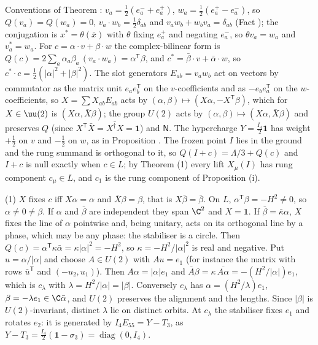 Conventions of Theorem : $v_{a} = \tfrac12(e_{a}^{-} + e_{a}^{+})$, $w_{a} = \tfrac12(e_{a}^{+} - e_{a}^{-})$, so $Q(v_{a}) = Q(w_{a}) = 0$, $v_{a}\cdot w_{b} = \tfrac12\delta_{ab}$ and $v_{a}w_{b} + w_{b}v_{a} = \delta_{ab}$ (Fact ); the conjugation is $x^{*} = \theta(\bar{x})$ with $\theta$ fixing $e_{a}^{+}$ and negating $e_{a}^{-}$, so $\theta v_{a} = w_{a}$ and $v_{a}^{*} = w_{a}$. For $c = \alpha\cdot v + \beta\cdot w$ the complex-bilinear form is $Q(c) = 2\sum_{a}\alpha_{a}\beta_{a}\,(v_{a}\cdot w_{a}) = \alpha^{\mathsf T}\beta$, and $c^{*} = \bar{\beta}\cdot v + \bar{\alpha}\cdot w$, so $c^{*}\cdot c = \tfrac12(|\alpha|^{2} + |\beta|^{2})$. The slot generators $E_{ab} = v_{a}w_{b}$ act on vectors by commutator as the matrix unit $e_{a}e_{b}^{\mathsf T}$ on the $v$-coefficients and as $-e_{b}e_{a}^{\mathsf T}$ on the $w$-coefficients, so $X = \sum X_{ab}E_{ab}$ acts by $(\alpha, \beta) \mapsto (X\alpha, -X^{\mathsf T}\beta)$, which for $X \in \uu(2)$ is $(X\alpha, \bar{X}\beta)$; the group $U(2)$ acts by $(\alpha, \beta) \mapsto (X\alpha, \bar{X}\beta)$ and preserves $Q$ (since $X^{\mathsf T}\bar{X} = \overline{X^{\dagger}X} = \mathbf{1}$) and $\mathsf{N}$. The hypercharge $Y = \tfrac{I_{4}}{2}\mathbf{1}$ has weight $+\tfrac12$ on $v$ and $-\tfrac12$ on $w$, as in Proposition . The frozen point $I$ lies in the ground and the rung summand is orthogonal to it, so $Q(I + c) = \Lambda/3 + Q(c)$ and $I + c$ is null exactly when $c \in L$; by Theorem (1) every lift $X_{\mu}(I)$ has rung component $c_{\mu} \in L$, and $c_{1}$ is the rung component of Proposition (i).

(1) $X$ fixes $c$ iff $X\alpha = \alpha$ and $\bar{X}\beta = \beta$, that is $X\bar{\beta} = \bar{\beta}$. On $L$, $\alpha^{\mathsf T}\beta = -H^{2} \ne 0$, so $\alpha \ne 0 \ne \beta$. If $\alpha$ and $\bar{\beta}$ are independent they span $\C^{2}$ and $X = \mathbf{1}$. If $\bar{\beta} = \bar{\kappa}\alpha$, $X$ fixes the line of $\alpha$ pointwise and, being unitary, acts on its orthogonal line by a phase, which may be any phase: the stabiliser is a circle. Then $Q(c) = \alpha^{\mathsf T}\kappa\bar{\alpha} = \kappa|\alpha|^{2} = -H^{2}$, so $\kappa = -H^{2}/|\alpha|^{2}$ is real and negative. Put $u = \alpha/|\alpha|$ and choose $A \in U(2)$ with $Au = e_{1}$ (for instance the matrix with rows $\bar{u}^{\mathsf T}$ and $(-u_{2}, u_{1})$). Then $A\alpha = |\alpha|e_{1}$ and $\bar{A}\beta = \kappa\,\overline{A\alpha} = -(H^{2}/|\alpha|)e_{1}$, which is $c_{\lambda}$ with $\lambda = H^{2}/|\alpha| = |\beta|$. Conversely $c_{\lambda}$ has $\alpha = (H^{2}/\lambda)e_{1}$, $\beta = -\lambda e_{1} \in \C\bar{\alpha}$, and $U(2)$ preserves the alignment and the lengths. Since $|\beta|$ is $U(2)$-invariant, distinct $\lambda$ lie on distinct orbits. At $c_{\lambda}$ the stabiliser fixes $e_{1}$ and rotates $e_{2}$: it is generated by $I_{4}E_{55} = Y - T_{3}$, as $Y - T_{3} = \tfrac{I_{4}}{2}(\mathbf{1} - \sigma_{3}) = \operatorname{diag}(0, I_{4})$.

